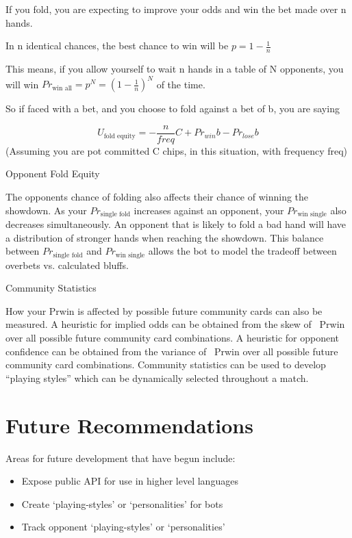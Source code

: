 If you fold, you are expecting to improve your odds and win the bet made over n hands.

In n identical chances, the best chance to win will be $p=1-\frac{1}{n}$

This means, if you allow yourself to wait n hands in a table of N opponents, you will win $\mathit{Pr}_{\text{win all}}=p^{N}=\left(1-\frac{1}{n}\right)^{N}$ of the time.

So if faced with a bet, and you choose to fold against a bet of b, you are saying

\begin{equation*}
U_{\text{fold equity}}=-{\frac{n}{\mathit{freq}}}C+\mathit{Pr}_{\mathit{win}}b-\mathit{Pr}_{\mathit{lose}}b
\end{equation*}
(Assuming you are pot committed C chips, in this situation, with frequency freq)


\bigskip

Opponent Fold Equity

The opponent{\textquotesingle}s chance of folding also affects their chance of winning the showdown. As your  $\mathit{Pr}_{\text{single fold}}$ increases against an opponent, your $\mathit{Pr}_{\text{win single}}$ also decreases simultaneously. An opponent that is likely to fold a bad hand will have a distribution of stronger hands when reaching the showdown. This balance between  $\mathit{Pr}_{\text{single fold}}$ and  $\mathit{Pr}_{\text{win single}}$ allows the bot to model the tradeoff between overbets vs. calculated bluffs.


\bigskip

Community Statistics

How your Prwin is affected by possible future community cards can also be measured. A heuristic for implied odds can be obtained from the skew of \ Prwin over all possible future community card combinations. A heuristic for opponent confidence can be obtained from the variance of \ Prwin over all possible future community card combinations. Community statistics can be used to develop {\textquotedblleft}playing styles{\textquotedblright} which can be dynamically selected throughout a match.

\chapter{Future Recommendations}
\label{sec:FutureDirection}

Areas for future development that have begun include:
\begin{itemize}
\singlespace
\item Expose public API for use in higher level languages
\item Create `playing-styles' or `personalities' for bots
\item Track opponent `playing-styles' or `personalities'
\end{itemize}

